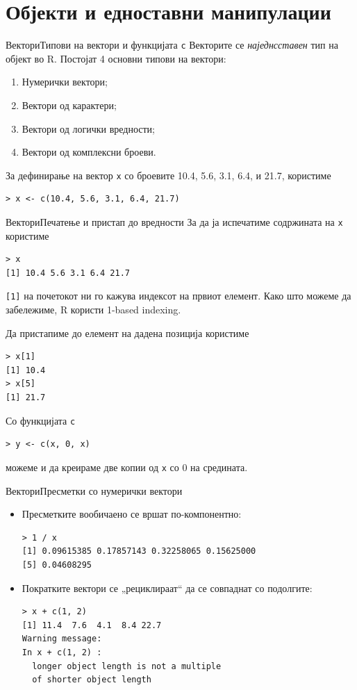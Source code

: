 \documentclass[hyperref={unicode}, xcolor={svgnames, table},
usepdftitle=false]{beamer}
\theoremstyle{remark}
\begin{document}
\section{Објекти и едноставни манипулации}

\begin{frame}[fragile]{Вектори}{Типови на вектори и функцијата
    \texttt{c}}
  Векторите се \emph{наједнсставен} тип на објект во R.  Постојат \num{4}
  основни типови на вектори:
  \begin{enumerate}
  \item Нумерички вектори;
  \item Вектори од карактери;
  \item Вектори од логички вредности;
  \item Вектори од комплексни броеви.
  \end{enumerate}

  За дефинирање на вектор \texttt{x} со броевите \num{10.4}, \num{5.6},
  \num{3.1}, \num{6.4}, и \num{21.7}, користиме
\begin{verbatim}
> x <- c(10.4, 5.6, 3.1, 6.4, 21.7)
\end{verbatim}
\end{frame}

\begin{frame}[fragile]{Вектори}{Печатење и пристап до вредности}
  За да ја испечатиме содржината на \texttt{x} користиме
\begin{verbatim}
> x
[1] 10.4 5.6 3.1 6.4 21.7
\end{verbatim}

  \texttt{[1]} на почетокот ни го кажува индексот на првиот елемент.
  Како што можеме да забележиме, R користи \num{1}-based indexing.

  Да пристапиме до елемент на дадена позиција користиме
\begin{verbatim}
> x[1]
[1] 10.4
> x[5]
[1] 21.7
\end{verbatim}

  Со функцијата \texttt{c}
\begin{verbatim}
> y <- c(x, 0, x)
\end{verbatim}
  можеме и да креираме две копии од \texttt{x} со \num{0} на средината.
\end{frame}

\begin{frame}[fragile]{Вектори}{Пресметки со нумерички вектори}
  \begin{itemize}
  \item Пресметките вообичаено се вршат по-компонентно:
\begin{verbatim}
> 1 / x
[1] 0.09615385 0.17857143 0.32258065 0.15625000
[5] 0.04608295
\end{verbatim}
  \item Пократките вектори се „рециклираат“ да се совпаднат со подолгите:
\begin{verbatim}
> x + c(1, 2)
[1] 11.4  7.6  4.1  8.4 22.7
Warning message:
In x + c(1, 2) :
  longer object length is not a multiple
  of shorter object length
\end{verbatim}
  \end{itemize}
\end{frame}
\end{document}
